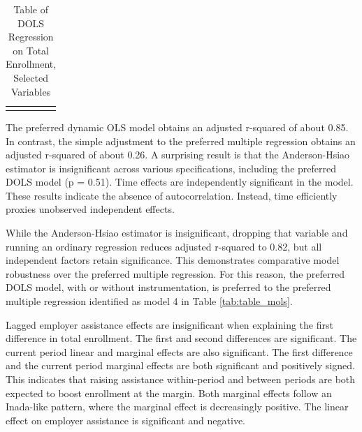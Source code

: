\documentclass[review]{elsarticle}
\begin{document}
\begin{table}
    \caption{Table of DOLS Regression on Total Enrollment, Selected Variables}
    \begin{tabularx}{\textwidth}{X}
        \centering
        
    \end{tabularx}
    \label{tab:table_dols}
\end{table}

The preferred dynamic OLS model obtains an adjusted r-squared of about 0.85.
In contrast, the simple adjustment to the preferred multiple regression
obtains an adjusted r-squared of about 0.26.
A surprising result is that the Anderson-Hsiao estimator is insignificant
across various specifications, including the preferred DOLS model (p = 0.51).
Time effects are independently significant in the model.
These results indicate the absence of autocorrelation.
Instead, time efficiently proxies unobserved independent effects.

While the Anderson-Hsiao estimator is insignificant,
dropping that variable and running an ordinary regression reduces adjusted r-squared to 0.82,
but all independent factors retain significance.
This demonstrates comparative model robustness over the preferred multiple regression.
For this reason, the preferred DOLS model, with or without instrumentation,
is preferred to the preferred multiple regression identified as
model 4 in Table \ref{tab:table_mols}.

Lagged employer assistance effects are insignificant when explaining the first difference in total enrollment.
The first and second differences are significant.
The current period linear and marginal effects are also significant.
The first difference and the current period marginal effects are both significant and positively signed.
This indicates that raising assistance within-period and between periods are both expected to boost enrollment at the margin.
Both marginal effects follow an Inada-like pattern, where the marginal effect is decreasingly positive.
The linear effect on employer assistance is significant and negative.
\end{document}
